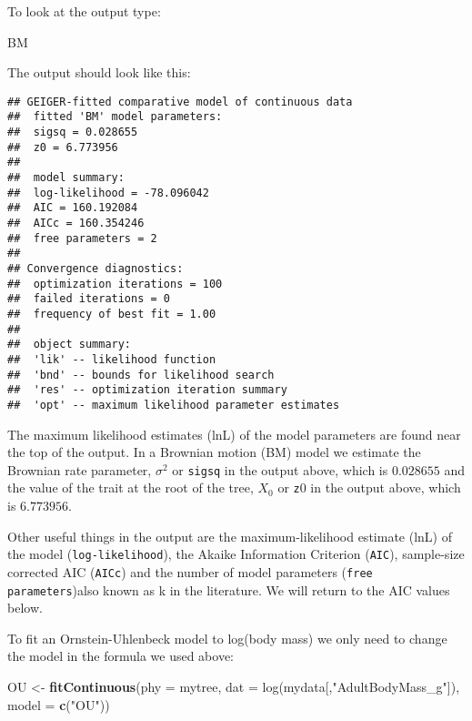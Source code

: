 \documentclass[11pt]{article}
\newcommand{\KeywordTok}[1]{\textcolor[rgb]{0.13,0.29,0.53}{\textbf{{#1}}}}
\newcommand{\DataTypeTok}[1]{\textcolor[rgb]{0.13,0.29,0.53}{{#1}}}
\newcommand{\CharTok}[1]{\textcolor[rgb]{0.31,0.60,0.02}{{#1}}}
\newcommand{\StringTok}[1]{\textcolor[rgb]{0.31,0.60,0.02}{{#1}}}
\newcommand{\NormalTok}[1]{{#1}}
\begin{document}
To look at the output type:

\begin{snugshade}
\begin{Highlighting}[]
\NormalTok{BM}
\end{Highlighting}
\end{snugshade}

The output should look like this:

\begin{verbatim}
## GEIGER-fitted comparative model of continuous data
##  fitted 'BM' model parameters:
##  sigsq = 0.028655
##  z0 = 6.773956
## 
##  model summary:
##  log-likelihood = -78.096042
##  AIC = 160.192084
##  AICc = 160.354246
##  free parameters = 2
## 
## Convergence diagnostics:
##  optimization iterations = 100
##  failed iterations = 0
##  frequency of best fit = 1.00
## 
##  object summary:
##  'lik' -- likelihood function
##  'bnd' -- bounds for likelihood search
##  'res' -- optimization iteration summary
##  'opt' -- maximum likelihood parameter estimates
\end{verbatim}

The maximum likelihood estimates (lnL) of the model parameters are found near the top of the output. In a Brownian motion (BM) model we estimate the Brownian rate parameter, $\sigma^2$ or \texttt{sigsq} in the output above, which is $0.028655$ and the value of the trait at the root of the tree, $X_0$ or \texttt{z$0$} in the output above, which is $6.773956$.

Other useful things in the output are the maximum-likelihood estimate (lnL) of the model (\texttt{log-likelihood}), the Akaike Information Criterion (\texttt{AIC}), sample-size corrected AIC (\texttt{AICc}) and the number of model parameters (\texttt{free parameters})also known as k in the literature. We will return to the AIC values below.

To fit an Ornstein-Uhlenbeck model to log(body mass) we only need to change the model in the formula we used above:

\begin{snugshade}
\begin{Highlighting}[]
\NormalTok{OU <-}\StringTok{ }\KeywordTok{fitContinuous}\NormalTok{(\DataTypeTok{phy = }mytree, \DataTypeTok{dat = }log(mydata[,"AdultBodyMass_g"]),} 
                    \DataTypeTok{model = }\KeywordTok{c}\NormalTok{(}\StringTok{"}\CharTok{OU}\StringTok{"}\NormalTok{))}
\end{Highlighting}
\end{snugshade}
\end{document}

